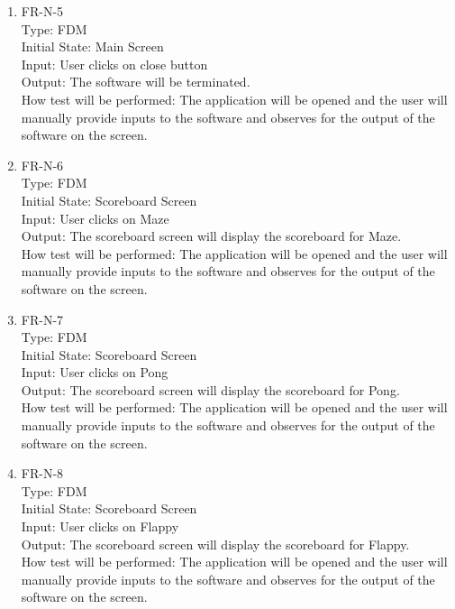 \documentclass[12pt, titlepage]{article}
\begin{document}
\begin{enumerate}
\item{FR-N-5\\}
Type: FDM\\
Initial State: Main Screen\\
Input: User clicks on close button\\
Output: The software will be terminated.\\
How test will be performed: The application will be opened and the user will manually provide inputs to the software and observes for the output of the software on the screen.\\

\item{FR-N-6\\}
Type: FDM\\
Initial State: Scoreboard Screen\\
Input: User clicks on Maze\\
Output: The scoreboard screen will display the scoreboard for Maze.\\
How test will be performed: The application will be opened and the user will manually provide inputs to the software and observes for the output of the software on the screen.\\

\item{FR-N-7\\}
Type: FDM\\
Initial State: Scoreboard Screen\\
Input: User clicks on Pong\\
Output: The scoreboard screen will display the scoreboard for Pong.\\
How test will be performed: The application will be opened and the user will manually provide inputs to the software and observes for the output of the software on the screen.\\

\item{FR-N-8\\}
Type: FDM\\
Initial State: Scoreboard Screen\\
Input: User clicks on Flappy\\
Output: The scoreboard screen will display the scoreboard for Flappy.\\
How test will be performed: The application will be opened and the user will manually provide inputs to the software and observes for the output of the software on the screen.\\


\end{enumerate}
\end{document}
